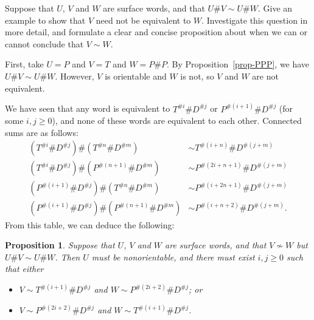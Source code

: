 \documentclass[a4paper]{amsart}
\newtheorem*{proposition*}{Proposition}
\begin{document}
\begin{exercise}
 Suppose that $U$, $V$ and $W$ are surface words, and that
 $U\# V\sim U\# W$.  Give an example to show that $V$ need not be
 equivalent to $W$.  Investigate this question in more detail, and
 formulate a clear and concise proposition about when we can or cannot
 conclude that $V\sim W$.
\end{exercise}
\begin{solution}
 First, take $U=P$ and $V=T$ and $W=P\# P$.  By
 Proposition~\ref{prop-PPP}, we have $U\# V\sim U\# W$.  However, $V$
 is orientable and $W$ is not, so $V$ and $W$ are not equivalent.  

 We have seen that any word is equivalent to $T^{\# i}\# D^{\# j}$
 or $P^{\#(i+1)}\#D^{\# j}$ (for some $i,j\geq 0$), and none of these
 words are equivalent to each other.  Connected sums are as follows: 
 \begin{align*}
  (T^{\# i}\# D^{\# j})\# (T^{\# n}\# D^{\# m}) 
   &\sim T^{\#(i+n)} \# D^{\#(j+m)} \\
  (T^{\# i}\# D^{\# j})\# (P^{\#(n+1)}\# D^{\# m}) 
   &\sim P^{\#(2i+n+1)} \# D^{\#(j+m)} \\
  (P^{\#(i+1)}\# D^{\# j})\# (T^{\# n}\# D^{\# m}) 
   &\sim P^{\#(i+2n+1)} \# D^{\#(j+m)} \\
  (P^{\#(i+1)}\# D^{\# j})\# (P^{\#(n+1)}\# D^{\# m}) 
   &\sim P^{\#(i+n+2)} \# D^{\#(j+m)}.
 \end{align*}
 From this table, we can deduce the following:
 \begin{proposition*}
  Suppose that $U$, $V$ and $W$ are surface words, and that
  $V\not\sim W$ but $U\# V\sim U\# W$.  Then $U$ must be
  nonorientable, and there must exist $i,j\geq 0$ such that either 
  \begin{itemize}
   \item[(a)] $V\sim T^{\#(i+1)}\# D^{\# j}$ and 
              $W\sim P^{\#(2i+2)}\# D^{\# j}$; or
   \item[(b)] $V\sim P^{\#(2i+2)}\# D^{\# j}$ and
              $W\sim T^{\#(i+1)}\# D^{\# j}$.
  \end{itemize}
 \end{proposition*}
\end{solution}
\end{document}
